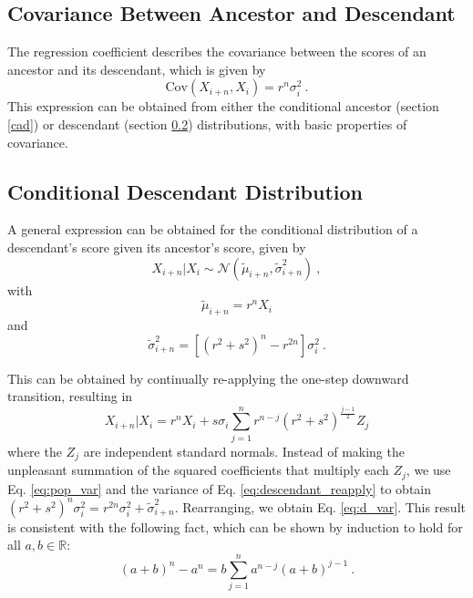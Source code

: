 \documentclass{svproc} %
\begin{document}
\subsection{Covariance Between Ancestor and Descendant}
The regression coefficient describes the covariance between the scores of an ancestor and its descendant, which is given by
\begin{equation}
\mathrm{Cov}(X_{i+n}, X_i) = r^n \sigma_i^2 \ .
\label{eq:covariance}
\end{equation}
This expression can be obtained from either the conditional ancestor (section \ref{cad}) or descendant (section \ref{cdd}) distributions, with basic properties of covariance. 


\subsection{Conditional Descendant Distribution} \label{cdd}

A general expression can be obtained for the conditional distribution of a descendant's score given its ancestor's score, given by
\begin{equation}
X_{i+n}|X_i \sim \mathcal{N}( \tilde{\mu}_{i+n}, \tilde{\sigma}_{i+n}^2) \ ,
\label{eq:d_dist}
\end{equation}
with
\begin{equation}
\tilde{\mu}_{i+n} = r^nX_i
\label{eq:d_mean}
\end{equation}
and
\begin{equation}
\tilde{\sigma}_{i+n}^2 = [(r^2+s^2)^n-r^{2n}] \sigma_i^2 \ .
\label{eq:d_var}
\end{equation}

This can be obtained by continually re-applying the one-step downward transition, resulting in
\begin{equation}
X_{i+n}|X_i = r^nX_i + s\sigma_i \sum_{j=1}^{n}r^{n-j}(r^2+s^2)^{\frac{j-1}{2}}Z_j 
\label{eq:descendant_reapply}
\end{equation}
where the $Z_j$ are independent standard normals. Instead of making the unpleasant summation of the squared coefficients that multiply each $Z_j$, we use Eq. \ref{eq:pop_var} and the variance of Eq. \ref{eq:descendant_reapply} to obtain $(r^2+s^2)^n  \sigma_{i}^2 =  r^{2n}\sigma_i^2 + \tilde{\sigma}_{i+n}^2$. Rearranging, we obtain Eq. \ref{eq:d_var}. This result is consistent with the following fact, which can be shown by induction to hold for all $a, b \in \mathbb{R}$:
\begin{equation}
(a+b)^n - a^n = b \sum_{j=1}^{n}a^{n-j}(a+b)^{j-1} \ .
\label{eq:induction_fact}
\end{equation}
\end{document}
